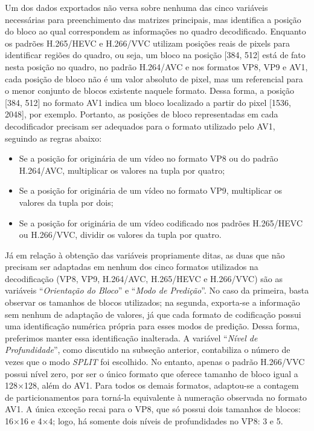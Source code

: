 Um dos dados exportados não versa sobre nenhuma das cinco variáveis necessárias para preenchimento das matrizes principais, mas identifica a posição do bloco ao qual correspondem as informações no quadro decodificado. Enquanto os padrões H.265/HEVC e H.266/VVC utilizam posições reais de pixels para identificar regiões do quadro, ou seja, um bloco na posição [384, 512] está de fato nesta posição no quadro, no padrão H.264/AVC e nos formatos VP8, VP9 e AV1, cada posição de bloco não é um valor absoluto de pixel, mas um referencial para o menor conjunto de blocos existente naquele formato. Dessa forma, a posição [384, 512] no formato AV1 indica um bloco localizado a partir do pixel [1536, 2048], por exemplo. Portanto, as posições de bloco representadas em cada decodificador precisam ser adequados para o formato utilizado pelo AV1, seguindo as regras abaixo:

\begin{itemize}
    \item Se a posição for originária de um vídeo no formato VP8 ou do padrão H.264/AVC, multiplicar os valores na tupla por quatro;

    \item Se a posição for originária de um vídeo no formato VP9, multiplicar os valores da tupla por dois;

    \item Se a posição for originária de um vídeo codificado nos padrões H.265/HEVC ou H.266/VVC, dividir os valores da tupla por quatro.
\end{itemize}

Já em relação à obtenção das variáveis propriamente ditas, as duas que não precisam ser adaptadas em nenhum dos cinco formatos utilizados na decodificação (VP8, VP9, H.264/AVC, H.265/HEVC e H.266/VVC) são as variáveis ``\textit{Orientação do Bloco}'' e ``\textit{Modo de Predição}''. No caso da primeira, basta observar os tamanhos de blocos utilizados; na segunda, exporta-se a informação sem nenhum de adaptação de valores, já que cada formato de codificação possui uma identificação numérica própria para esses modos de predição. Dessa forma, preferimos manter essa identificação inalterada. A variável ``\textit{Nível de Profundidade}'', como discutido na subseção anterior, contabiliza o número de vezes que o modo \textit{SPLIT} foi escolhido. No entanto, apenas o padrão H.266/VVC possui nível zero, por ser o único formato que oferece tamanho de bloco igual a 128$\times$128, além do AV1. Para todos os demais formatos, adaptou-se a contagem de particionamentos para torná-la equivalente à numeração observada no formato AV1. A única exceção recai para o VP8, que só possui dois tamanhos de blocos: 16$\times$16 e 4$\times$4; logo, há somente dois níveis de profundidades no VP8: 3 e 5.

